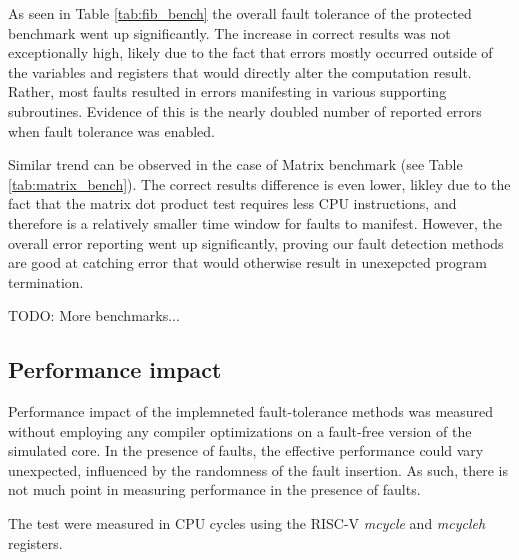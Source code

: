 As seen in Table \ref{tab:fib_bench} the overall fault tolerance of the protected benchmark went up significantly. The increase in correct results was not exceptionally high, likely due to the fact that errors mostly occurred outside of the variables and registers that would directly alter the computation result. Rather, most faults resulted in errors manifesting in various supporting subroutines. Evidence of this is the nearly doubled number of reported errors when fault tolerance was enabled.

\begin{table}[h]
\centering
{}
\caption{Matrix multiplication benchmark statistics}
\label{tab:matrix_bench}
\end{table}

Similar trend can be observed in the case of Matrix benchmark (see Table \ref{tab:matrix_bench}). The correct results difference is even lower, likley due to the fact that the matrix dot product test requires less CPU instructions, and therefore is a relatively smaller time window for faults to manifest. However, the overall error reporting went up significantly, proving our fault detection methods are good at catching error that would otherwise result in unexepcted program termination.

TODO: More benchmarks...

\subsection{Performance impact}

Performance impact of the implemneted fault-tolerance methods was measured without employing any compiler optimizations on a fault-free version of the simulated core. In the presence of faults, the effective performance could vary unexpected, influenced by the randomness of the fault insertion. As such, there is not much point in measuring performance in the presence of faults.

The test were measured in CPU cycles using the RISC-V \textit{mcycle} and \textit{mcycleh} registers.

